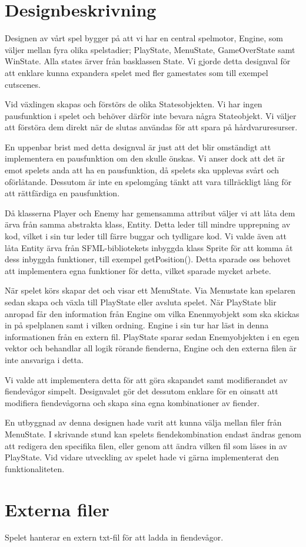 \documentclass{TDP005mall}
\begin{document}
\newpage

\section{Designbeskrivning}
Designen av vårt spel bygger på att vi har en central spelmotor, Engine, som väljer mellan fyra olika spelstadier;
PlayState, MenuState, GameOverState samt WinState. Alla states ärver från basklassen State.
Vi gjorde detta designval för att enklare kunna expandera spelet med fler gamestates som till exempel cutscenes.


Vid växlingen skapas och förstörs de olika Statesobjekten. Vi har ingen pausfunktion i spelet och behöver därför inte bevara några Stateobjekt. Vi väljer att förstöra dem direkt när de slutas användas för att spara på hårdvaruresurser.

En uppenbar brist med detta designval är just att det blir omständigt att implementera en pausfunktion om den skulle önskas. Vi anser dock att det är emot spelets anda att ha en pausfunktion, då spelets ska upplevas svårt och oförlåtande. Dessutom är inte en spelomgång tänkt att vara tillräckligt lång för att rättfärdiga en pausfunktion. 

Då klasserna Player och Enemy har gemensamma attribut väljer vi att låta dem ärva från samma abstrakta klass, Entity. Detta leder till mindre upprepning av kod, vilket i sin tur leder till färre buggar och tydligare kod. Vi valde även att låta Entity ärva från SFML-bibliotekets inbyggda klass Sprite för att komma åt dess inbyggda funktioner, till exempel getPosition(). Detta sparade oss behovet att implementera egna funktioner för detta, vilket sparade mycket arbete. 

När spelet körs skapar det och visar ett MenuState. 
Via Menustate kan spelaren sedan skapa och växla till PlayState eller avsluta spelet.
När PlayState blir anropad får den information från Engine om vilka Enenmyobjekt som ska skickas in på spelplanen samt i vilken ordning. Engine i sin tur har läst in denna informationen från en extern fil.
PlayState sparar sedan Enemyobjekten i en egen vektor och behandlar all logik rörande fienderna, Engine och den externa filen är inte ansvariga i detta.

Vi valde att implementera detta för att göra skapandet samt modifierandet av fiendevågor simpelt. Designvalet gör det dessutom enklare för en oinsatt att modifiera fiendevågorna och skapa sina egna kombinationer av fiender.

En utbyggnad av denna designen hade varit att kunna välja mellan filer från MenuState. I skrivande stund kan spelets fiendekombination endast ändras genom att redigera den specifika filen, eller genom att ändra vilken fil som läses in av PlayState. Vid vidare utveckling av spelet hade vi gärna implementerat den funktionaliteten.

\section{Externa filer}
Spelet hanterar en extern txt-fil för att ladda in fiendevågor.   
\end{document}
